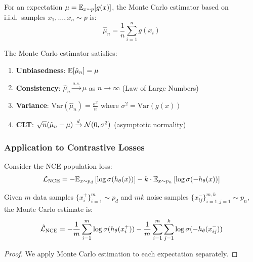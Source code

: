 \begin{notechapter}
\begin{definition}
For an expectation $\mu = \mathbb{E}_{x \sim p}[g(x)]$, the Monte Carlo estimator based on i.i.d.\ samples $x_1, \ldots, x_n \sim p$ is:
\begin{equation}
\hat{\mu}_n = \frac{1}{n} \sum_{i=1}^{n} g(x_i)
\end{equation}
\end{definition}

\begin{theorem}
The Monte Carlo estimator satisfies:
\begin{enumerate}[label=(\roman*)]
    \item \textbf{Unbiasedness}: $\mathbb{E}[\hat{\mu}_n] = \mu$
    \item \textbf{Consistency}: $\hat{\mu}_n \xrightarrow{a.s.} \mu$ as $n \to \infty$ (Law of Large Numbers)
    \item \textbf{Variance}: $\text{Var}(\hat{\mu}_n) = \frac{\sigma^2}{n}$ where $\sigma^2 = \text{Var}(g(x))$
    \item \textbf{CLT}: $\sqrt{n}(\hat{\mu}_n - \mu) \xrightarrow{d} \mathcal{N}(0, \sigma^2)$ (asymptotic normality)
\end{enumerate}
\end{theorem}

\subsubsection{Application to Contrastive Losses}

Consider the NCE population loss:
\begin{equation}
\mathcal{L}_{\text{NCE}} = -\mathbb{E}_{x \sim p_d}\left[\log \sigma(h_\theta(x))\right] - k \cdot \mathbb{E}_{x \sim p_n}\left[\log \sigma(-h_\theta(x))\right]
\end{equation}

\begin{proposition}
Given $m$ data samples $\{x_i^+\}_{i=1}^m \sim p_d$ and $mk$ noise samples $\{x_{ij}^-\}_{i=1,j=1}^{m,k} \sim p_n$, the Monte Carlo estimate is:
\begin{equation}
\hat{\mathcal{L}}_{\text{NCE}} = -\frac{1}{m} \sum_{i=1}^{m} \log \sigma(h_\theta(x_i^+)) - \frac{1}{m} \sum_{i=1}^{m} \sum_{j=1}^{k} \log \sigma(-h_\theta(x_{ij}^-))
\end{equation}
\end{proposition}

\begin{proof}
We apply Monte Carlo estimation to each expectation separately.


\end{proof}
\end{notechapter}
